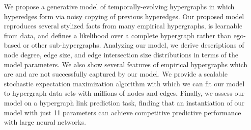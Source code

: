 We propose a generative model of temporally-evolving hypergraphs in which hyperedges form via noisy copying of previous hyperedges. 
Our proposed model reproduces several stylized facts from many empirical hypergraphs, is learnable from data, and defines a likelihood over a complete hypergraph rather than ego-based or other sub-hypergraphs. 
Analyzing our model, we derive descriptions of node degree, edge size, and edge intersection size distributions in terms of the model parameters. 
We also show several features of empirical hypergraphs which are and are not successfully captured by our model. 
We provide a scalable stochastic expectation maximization algorithm with which we can fit our model to hypergraph data sets with millions of nodes and edges. 
Finally, we assess our model on a hypergraph link prediction task, finding that an instantiation of our model with just 11 parameters can achieve competitive predictive performance with large neural networks. 
